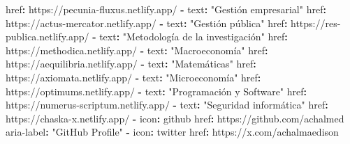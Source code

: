 \documentclass[
  doc,
  floatsintext,
  longtable,
  a4paper,
  nolmodern,
  notxfonts,
  notimes,
  12pt,
  colorlinks=true,linkcolor=blue,citecolor=blue,urlcolor=blue]{apa7}
\newenvironment{Shaded}{\begin{snugshade}}{\end{snugshade}}
\newcommand{\AttributeTok}[1]{\textcolor[rgb]{0.40,0.45,0.13}{#1}}
\newcommand{\FunctionTok}[1]{\textcolor[rgb]{0.28,0.35,0.67}{#1}}
\newcommand{\KeywordTok}[1]{\textcolor[rgb]{0.00,0.23,0.31}{\textbf{#1}}}
\newcommand{\StringTok}[1]{\textcolor[rgb]{0.13,0.47,0.30}{#1}}
\begin{document}
\begin{Shaded}
\begin{Highlighting}[]
\AttributeTok{            }\FunctionTok{href}\KeywordTok{:}\AttributeTok{ https://pecunia{-}fluxus.netlify.app/}
\AttributeTok{          }\KeywordTok{{-}}\AttributeTok{ }\FunctionTok{text}\KeywordTok{:}\AttributeTok{ }\StringTok{"Gestión empresarial"}
\AttributeTok{            }\FunctionTok{href}\KeywordTok{:}\AttributeTok{ https://actus{-}mercator.netlify.app/}
\AttributeTok{          }\KeywordTok{{-}}\AttributeTok{ }\FunctionTok{text}\KeywordTok{:}\AttributeTok{ }\StringTok{"Gestión pública"}
\AttributeTok{            }\FunctionTok{href}\KeywordTok{:}\AttributeTok{ https://res{-}publica.netlify.app/}
\AttributeTok{          }\KeywordTok{{-}}\AttributeTok{ }\FunctionTok{text}\KeywordTok{:}\AttributeTok{ }\StringTok{"Metodología de la investigación"}
\AttributeTok{            }\FunctionTok{href}\KeywordTok{:}\AttributeTok{ https://methodica.netlify.app/}
\AttributeTok{          }\KeywordTok{{-}}\AttributeTok{ }\FunctionTok{text}\KeywordTok{:}\AttributeTok{ }\StringTok{"Macroeconomía"}
\AttributeTok{            }\FunctionTok{href}\KeywordTok{:}\AttributeTok{ https://aequilibria.netlify.app/}
\AttributeTok{          }\KeywordTok{{-}}\AttributeTok{ }\FunctionTok{text}\KeywordTok{:}\AttributeTok{ }\StringTok{"Matemáticas"}
\AttributeTok{            }\FunctionTok{href}\KeywordTok{:}\AttributeTok{ https://axiomata.netlify.app/}
\AttributeTok{          }\KeywordTok{{-}}\AttributeTok{ }\FunctionTok{text}\KeywordTok{:}\AttributeTok{ }\StringTok{"Microeconomía"}
\AttributeTok{            }\FunctionTok{href}\KeywordTok{:}\AttributeTok{ https://optimums.netlify.app/}
\AttributeTok{          }\KeywordTok{{-}}\AttributeTok{ }\FunctionTok{text}\KeywordTok{:}\AttributeTok{ }\StringTok{"Programación y Software"}
\AttributeTok{            }\FunctionTok{href}\KeywordTok{:}\AttributeTok{ https://numerus{-}scriptum.netlify.app/}
\AttributeTok{          }\KeywordTok{{-}}\AttributeTok{ }\FunctionTok{text}\KeywordTok{:}\AttributeTok{ }\StringTok{"Seguridad informática"}
\AttributeTok{            }\FunctionTok{href}\KeywordTok{:}\AttributeTok{ https://chaska{-}x.netlify.app/}
\AttributeTok{            }
\AttributeTok{      }\KeywordTok{{-}}\AttributeTok{ }\FunctionTok{icon}\KeywordTok{:}\AttributeTok{ github}
\AttributeTok{        }\FunctionTok{href}\KeywordTok{:}\AttributeTok{ https://github.com/achalmed}
\AttributeTok{        }\FunctionTok{aria{-}label}\KeywordTok{:}\AttributeTok{ }\StringTok{"GitHub Profile"}
\AttributeTok{        }
\AttributeTok{      }\KeywordTok{{-}}\AttributeTok{ }\FunctionTok{icon}\KeywordTok{:}\AttributeTok{ twitter}
\AttributeTok{        }\FunctionTok{href}\KeywordTok{:}\AttributeTok{ https://x.com/achalmaedison}

\end{Highlighting}
\end{Shaded}
\end{document}
